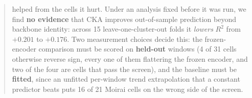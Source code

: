 \documentclass{article} %
\begin{document}
\begin{abstract}
helped from the cells it hurt.  Under an analysis fixed before it was run, we find
\textbf{no evidence} that CKA improves out-of-sample prediction beyond backbone
identity: across 15 leave-one-cluster-out folds it \emph{lowers} $R^2$ from
$+0.201$ to $+0.176$.
Two measurement choices decide this: the frozen-encoder comparison must be scored
on \textbf{held-out} windows (4 of 31 cells otherwise reverse sign, every one of
them flattering the frozen encoder, and two of the four are cells that pass the
screen), and the baseline must be \textbf{fitted},
since an unfitted per-window trend extrapolation that a constant predictor beats
puts 16 of 21 Moirai cells on the wrong side of the screen.
\end{abstract}
















\end{document}
